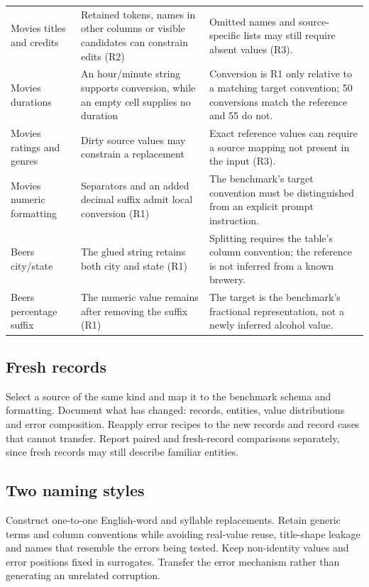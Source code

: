 \documentclass[10pt,a4paper]{article}
\begin{document}
\begin{longtable}{@{}>{\raggedright\arraybackslash}p{}>{\raggedright\arraybackslash}p{}>{\raggedright\arraybackslash}p{}@{}}
Movies titles and credits & Retained tokens, names in other columns or visible candidates can constrain edits (R2) & Omitted names and source-specific lists may still require absent values (R3). \\
Movies durations & An hour/minute string supports conversion, while an empty cell supplies no duration & Conversion is R1 only relative to a matching target convention; 50 conversions match the reference and 55 do not. \\
Movies ratings and genres & Dirty source values may constrain a replacement & Exact reference values can require a source mapping not present in the input (R3). \\
Movies numeric formatting & Separators and an added decimal suffix admit local conversion (R1) & The benchmark's target convention must be distinguished from an explicit prompt instruction. \\
Beers city/state & The glued string retains both city and state (R1) & Splitting requires the table's column convention; the reference is not inferred from a known brewery. \\
Beers percentage suffix & The numeric value remains after removing the suffix (R1) & The target is the benchmark's fractional representation, not a newly inferred alcohol value. \\
\end{longtable}\endgroup

\subsection{Fresh records}

Select a source of the same kind and map it to the benchmark schema and formatting. Document what has changed: records, entities, value distributions and error composition. Reapply error recipes to the new records and record cases that cannot transfer. Report paired and fresh-record comparisons separately, since fresh records may still describe familiar entities.

\subsection{Two naming styles}

Construct one-to-one English-word and syllable replacements. Retain generic terms and column conventions while avoiding real-value reuse, title-shape leakage and names that resemble the errors being tested. Keep non-identity values and error positions fixed in surrogates. Transfer the error mechanism rather than generating an unrelated corruption.
\end{document}
